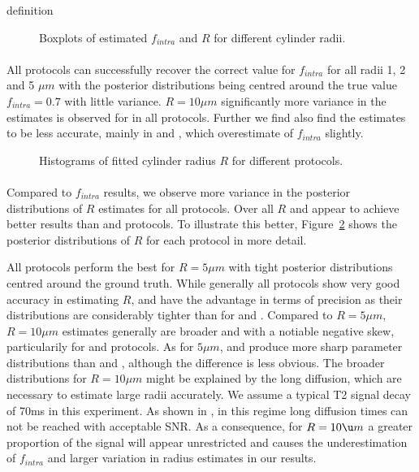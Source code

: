 definition
\begin{figure}[H]
	\centering
	
	
	\caption{Boxplots of estimated $f_{intra}$ and $R$ for different cylinder radii.}
	\label{fig:chapter7 exp1 boxplots 60mT}
\end{figure}


\paragraph{} All protocols can successfully recover the correct value for $f_{intra}$ for all radii 1, 2 and 5 $\mu m$ with the posterior distributions being centred around the true value $f_{intra}=0.7$ with little variance. $R=10\mu m$ significantly more variance in the estimates is observed for in all protocols. Further we find also find the estimates to be less accurate, mainly in {\SF} and {\SD}, which overestimate of $f_{intra}$ slightly.

\begin{figure}[H]
	 \centering
	 
	 \caption{Histograms of fitted cylinder radius $R$ for different protocols.}
	 \label{fig:chapter7 exp1 histograms 60mT}
\end{figure}

\paragraph{} Compared to $f_{intra}$ results, we observe more variance in the posterior distributions of $R$ estimates for all protocols. Over all $R$ {\DO} and {\FD} appear to achieve better results than {\OI} and {\SD} protocols. To illustrate this better, Figure~\ref{fig:chapter7 exp1 histograms 60mT} shows the posterior distributions of $R$ for each protocol in more detail.

All protocols perform the best for $R=5\mu m$ with tight posterior distributions centred around the ground truth. While generally all protocols show very good accuracy in estimating $R$, {\DO} and {\FD} have the advantage in terms of precision as their distributions are considerably tighter than for {\OI} and {\SD}. Compared to $R=5\mu m$, $R=10\mu m$ estimates generally are broader and with a notiable  negative skew, particularily for {\OI} and {\SD} protocols.  As for $5\mu m$, {\DO} and {\FD} produce more sharp parameter distributions than {\OI} and {\SD}, although the difference is less obvious. The broader distributions for $R=10\mu m$ might be explained by the long diffusion, which are necessary to estimate large radii accurately.  We assume a typical T2 signal decay of 70ms in this experiment. As shown in \citep{Alexander:STEAM}, in this regime long diffusion times can not be reached with acceptable SNR. As a consequence, for $R=10\u m$ a greater proportion of the signal will appear unrestricted and causes the underestimation of $f_{intra}$ and larger variation in radius estimates in our results.

